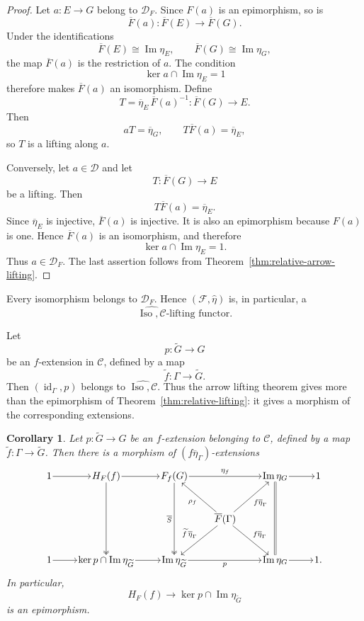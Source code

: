 \documentclass[10pt]{amsart}
\newtheorem{corollary}[theorem]{Corollary}
\renewcommand{\*}{\cdot {\dots} \cdot}
\newcommand{\?}[1]{\overset{?}{#1}}
\newcommand{\id}{\operatorname{id}}
\numberwithin{equation}{section}
\begin{document}
\begin{proof}
Let $a\colon E\to G$ belong to $\mathcal D_F$. Since $F(a)$ is
an epimorphism, so is
\[
\overline F(a)\colon\overline F(E)\longrightarrow\overline F(G).
\]
Under the identifications
\[
\overline F(E)\cong\operatorname{Im}\eta_E,
\qquad
\overline F(G)\cong\operatorname{Im}\eta_G,
\]
the map $\overline F(a)$ is the restriction of $a$. The condition
\[
\ker a\cap\operatorname{Im}\eta_E=1
\]
therefore makes $\overline F(a)$ an isomorphism. Define
\[
T=\overline\eta_E\,\overline F(a)^{-1}
\colon\overline F(G)\longrightarrow E.
\]
Then
\[
aT=\overline\eta_G,
\qquad
T\overline F(a)=\overline\eta_E,
\]
so $T$ is a lifting along $a$.

Conversely, let $a\in\mathcal D$ and let
\[
T\colon\overline F(G)\longrightarrow E
\]
be a lifting. Then
\[
T\overline F(a)=\overline\eta_E.
\]
Since $\overline\eta_E$ is injective, $\overline F(a)$ is
injective. It is also an epimorphism because $F(a)$ is one. Hence
$\overline F(a)$ is an isomorphism, and therefore
\[
\ker a\cap\operatorname{Im}\eta_E=1.
\]
Thus $a\in\mathcal D_F$. The last assertion follows from
Theorem~\ref{thm:relative-arrow-lifting}.
\end{proof}

Every isomorphism belongs to $\mathcal D_F$. Hence
$(\mathscr F,\widehat\eta)$ is, in particular, a
\[
\widehat{\operatorname{Iso},\mathcal C}
\text{-lifting functor}.
\]

Let
\[
p\colon\widetilde G\longrightarrow G
\]
be an $f$-extension in $\mathcal C$, defined by a map
\[
\widetilde f\colon\Gamma\longrightarrow\widetilde G.
\]
Then $(\id_\Gamma, p)$ belongs to $\widehat{\operatorname{Iso},\mathcal C}$. Thus the
arrow lifting theorem gives more than the epimorphism of
Theorem~\ref{thm:relative-lifting}: it gives a morphism of the
corresponding extensions.

\begin{corollary}\label{cor:morphism-f-extensions}
Let $p\colon\widetilde G\to G$ be an $f$-extension belonging to
$\mathcal C$, defined by a map
$\widetilde f\colon\Gamma\to\widetilde G$. Then there is a
morphism of $(f\overline\eta_\Gamma)$-extensions
\[
\begin{tikzcd}[
  row sep=3.0em,
  column sep=2.5em,
  cells={nodes={inner sep=1pt}}
]
1 \arrow[r]
&
H_F(f)
  \arrow[r]
  \arrow[dd,two heads]
&
F_f(G)
  \arrow[rr,"\eta_f"]
  \arrow[dd,two heads,"\overline S"']
&&
\operatorname{Im}\eta_G
  \arrow[r]
  \arrow[dd,equal]
&
1
\\
&&&
\overline F(\Gamma)
  \arrow[ul,"\rho_f"]
  \arrow[ur,"f\overline\eta_\Gamma"']
  \arrow[dl,"\widetilde f\,\overline\eta_\Gamma"']
  \arrow[dr,"f\overline\eta_\Gamma"]
&&
\\
1 \arrow[r]
&
\ker p\cap\operatorname{Im}\eta_{\widetilde G}
  \arrow[r]
&
\operatorname{Im}\eta_{\widetilde G}
  \arrow[rr,"p"']
&&
\operatorname{Im}\eta_G
  \arrow[r]
&
1 .
\end{tikzcd}
\]
In particular,
\[
H_F(f)\longrightarrow
\ker p\cap\operatorname{Im}\eta_{\widetilde G}
\]
is an epimorphism.
\end{corollary}
\end{document}
